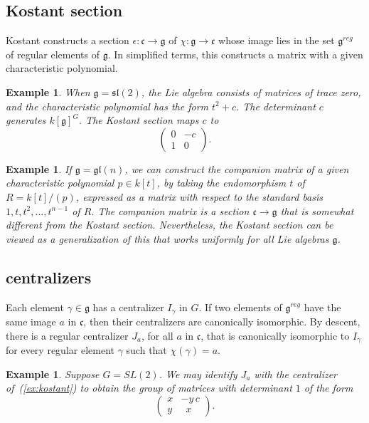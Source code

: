 \documentclass[brochure,english,12pt]{bourbaki}
\theoremstyle{plain}
\newtheorem{example}[equation]{Example}
\def\gl{\mathfrak{gl}}
\def\sl{\mathfrak{sl}}
\def\g{\mathfrak{g}}
\def\cc{\mathfrak{c}}
\begin{document}
\subsection{Kostant section}

Kostant constructs a section $\epsilon:\cc\to\g$ of $\chi:\g\to\cc$
whose image lies in the set $\g^{reg}$ of regular elements of $\g$.
In simplified terms, this constructs a matrix with a given
characteristic polynomial.


\begin{example}
  When $\g=\sl(2)$, the Lie algebra consists of matrices of trace zero, and the characteristic polynomial 
   has the form $t^2 +c$.  The determinant $c$ generates  $k[\g]^G$.  
  The Kostant section maps $c$ to
\begin{equation}\label{ex:kostant}
\begin{pmatrix} 0 & -c\\ 1 & 0\end{pmatrix}.
\end{equation}
\end{example}


\begin{example}
  If $\g=\gl(n)$, we can construct the companion matrix of a given
  characteristic polynomial $p\in k[t]$, by taking the endomorphism $t$ of
  $R=k[t]/(p)$, expressed as a matrix with respect to the standard
  basis $1,t,t^2,\ldots,t^{n-1}$ of $R$.  The companion matrix is a
  section $\cc\to\g$ that is somewhat different from the Kostant
  section.  Nevertheless, the Kostant section can be viewed as a
  generalization of this that works uniformly for all Lie algebras
  $\g$.
\end{example}


\subsection{centralizers}

Each element $\gamma\in\g$ has a centralizer $I_\gamma$ in $G$.
If two elements of $\g^{reg}$ have the same image $a$ in $\cc$, then
their centralizers are canonically isomorphic.  By descent, there is a
regular centralizer $J_a$, for all $a$ in $\cc$,  that is canonically isomorphic to
$I_\gamma$ for every regular element $\gamma$ such that
$\chi(\gamma)=a$.



\begin{example} Suppose $G=SL(2)$.
  We may identify $J_a$ with the centralizer of~(\ref{ex:kostant}) to obtain the
   group of matrices with determinant $1$ of the form
\[
\begin{pmatrix} x & -y\, c\\ y & \phantom{y}x
\end{pmatrix}.
\]
\end{example}
\end{document}

